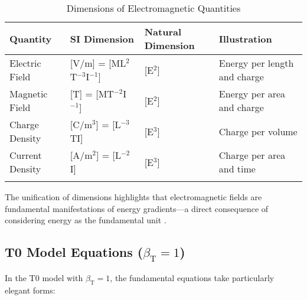 \documentclass[12pt,a4paper]{article}
\newcommand{\betaT}{\beta_{\text{T}}}
\begin{document}
	\begin{table}[ht]
		\centering
		\begin{adjustbox}{scale=0.85}
			\begin{tabular}{llll}
				\hline
				\textbf{Quantity} & \textbf{SI Dimension} & \textbf{Natural Dimension} & \textbf{Illustration} \\
				\hline
				Electric Field & [V/m] = [ML$^2$T$^{-3}$I$^{-1}$] & [E$^2$] & Energy per length and charge \\
				Magnetic Field & [T] = [MT$^{-2}$I$^{-1}$] & [E$^2$] & Energy per area and charge \\
				Charge Density & [C/m$^3$] = [L$^{-3}$TI] & [E$^3$] & Charge per volume \\
				Current Density & [A/m$^2$] = [L$^{-2}$I] & [E$^3$] & Charge per area and time \\
				\hline
				\multicolumn{3}{c}{} \\
				\hline
			\end{tabular}
		\end{adjustbox}
		\caption{Dimensions of Electromagnetic Quantities}
		\label{tab:em_dimensions}
	\end{table}
	
	The unification of dimensions highlights that electromagnetic fields are fundamental manifestations of energy gradients—a direct consequence of considering energy as the fundamental unit \cite{pascher_alpha_2025}.
	
	\subsection{T0 Model Equations ($\betaT = 1$)}
	
	In the T0 model with $\betaT = 1$, the fundamental equations take particularly elegant forms:
	
\end{document}
